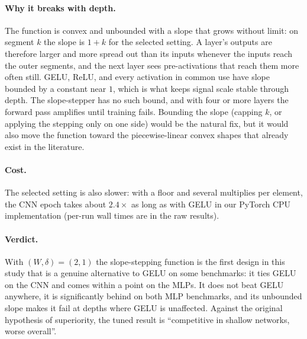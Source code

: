 \documentclass[11pt]{article}
\begin{document}
{\paragraph{Why it breaks with depth.} The function is convex and unbounded with a slope that grows
without limit: on segment $k$ the slope is $1+k$ for the selected setting. A layer's outputs are
therefore larger and more spread out than its inputs whenever the inputs reach the outer segments,
and the next layer sees pre-activations that reach them more often still. GELU, ReLU, and every
activation in common use have slope bounded by a constant near $1$, which is what keeps signal scale
stable through depth. The slope-stepper has no such bound, and with four or more layers the
forward pass amplifies until training fails. Bounding the slope (capping $k$, or applying the stepping
only on one side) would be the natural fix, but it would also move the function toward the
piecewise-linear convex shapes that already exist in the literature.

\paragraph{Cost.} The selected setting is also slower: with a floor and several multiplies per
element, the CNN epoch takes about $2.4\times$ as long as with GELU in our PyTorch CPU
implementation (per-run wall times are in the raw results).

\paragraph{Verdict.} With $(W,\delta)=(2,1)$ the slope-stepping function is the first design in this
study that is a genuine alternative to GELU on some benchmarks: it ties GELU on the CNN and comes
within a point on the MLPs. It does not beat GELU anywhere, it is significantly behind on both MLP
benchmarks, and its unbounded slope makes it fail at depths where GELU is unaffected. Against the
original hypothesis of superiority, the tuned result is ``competitive in shallow networks, worse
overall''.
}{}
\end{document}

